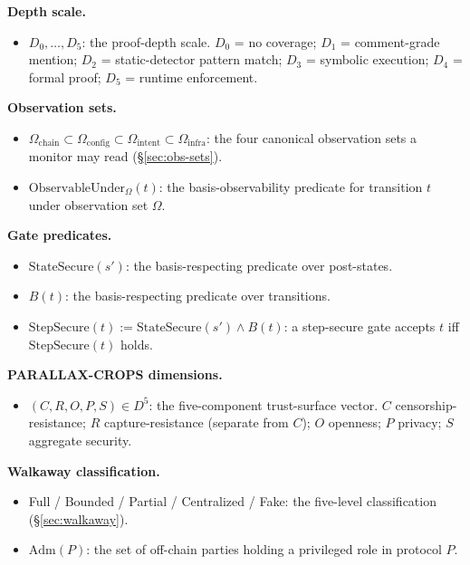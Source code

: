 \documentclass[11pt,a4paper]{article}
\begin{document}
\noindent\textbf{Depth scale.}
\begin{itemize}\itemsep0em
  \item $D_0,\dots,D_5$: the proof-depth scale. $D_0$ = no coverage; $D_1$ = comment-grade mention; $D_2$ = static-detector pattern match; $D_3$ = symbolic execution; $D_4$ = formal proof; $D_5$ = runtime enforcement.
\end{itemize}

\noindent\textbf{Observation sets.}
\begin{itemize}\itemsep0em
  \item $\Omega_{\mathrm{chain}} \subset \Omega_{\mathrm{config}} \subset \Omega_{\mathrm{intent}} \subset \Omega_{\mathrm{infra}}$: the four canonical observation sets a monitor may read (\S\ref{sec:obs-sets}).
  \item $\mathrm{ObservableUnder}_\Omega(t)$: the basis-observability predicate for transition $t$ under observation set $\Omega$.
\end{itemize}

\noindent\textbf{Gate predicates.}
\begin{itemize}\itemsep0em
  \item $\mathrm{StateSecure}(s')$: the basis-respecting predicate over post-states.
  \item $B(t)$: the basis-respecting predicate over transitions.
  \item $\mathrm{StepSecure}(t) := \mathrm{StateSecure}(s') \wedge B(t)$: a step-secure gate accepts $t$ iff $\mathrm{StepSecure}(t)$ holds.
\end{itemize}

\noindent\textbf{PARALLAX-CROPS dimensions.}
\begin{itemize}\itemsep0em
  \item $(C, R, O, P, S) \in D^5$: the five-component trust-surface vector. $C$ censorship-resistance; $R$ capture-resistance (separate from $C$); $O$ openness; $P$ privacy; $S$ aggregate security.
\end{itemize}

\noindent\textbf{Walkaway classification.}
\begin{itemize}\itemsep0em
  \item Full / Bounded / Partial / Centralized / Fake: the five-level classification (\S\ref{sec:walkaway}).
  \item $\mathrm{Adm}(P)$: the set of off-chain parties holding a privileged role in protocol $P$.
\end{itemize}
\end{document}
